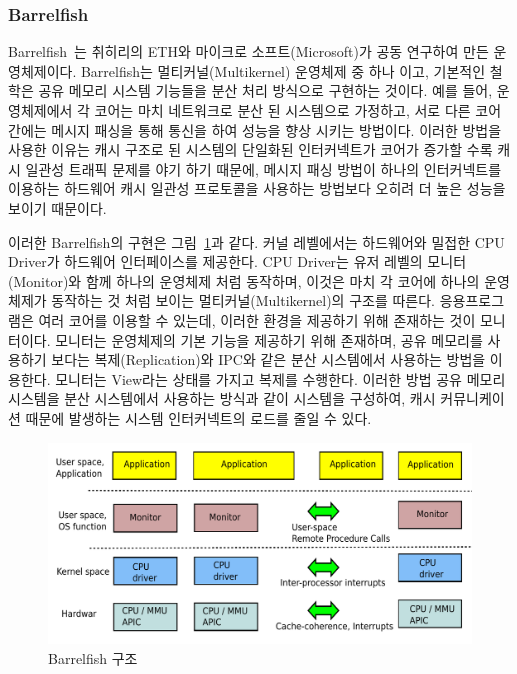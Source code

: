 \subsubsection{Barrelfish}

Barrelfish~\cite{Baumann2009Barrelfish}는 취히리의 ETH와 마이크로 소프트(Microsoft)가
공동 연구하여 만든 운영체제이다.
Barrelfish는 멀티커널(Multikernel) 운영체제 중 하나 이고, 기본적인 철학은 공유 메모리 시스템 
기능들을 분산 처리 방식으로 구현하는 것이다.
예를 들어, 운영체제에서 각 코어는 마치 네트워크로 분산 된 시스템으로 가정하고, 서로 다른 코어 간에는 메시지 
패싱을 통해 통신을 하여 성능을 향상 시키는 방법이다. 
이러한 방법을 사용한 이유는 캐시 구조로 된 시스템의 단일화된 인터커넥트가 코어가 증가할 수록 캐시 
일관성 트래픽 문제를 야기 하기 때문에, 메시지 패싱 방법이 하나의 인터커넥트를 이용하는 하드웨어 캐시 일관성 
프로토콜을 사용하는 방법보다 오히려 더 높은 성능을 보이기 때문이다. 

이러한 Barrelfish의 구현은 그림~\ref{fig:Barrelfish}과 같다.
커널 레벨에서는 하드웨어와 밀접한 CPU Driver가 하드웨어 인터페이스를 제공한다.
CPU Driver는 유저 레벨의 모니터(Monitor)와 함께 하나의 운영체제 처럼 동작하며, 
이것은 마치 각 코어에 하나의 운영체제가 동작하는 것 처럼 보이는 멀티커널(Multikernel)의 구조를 따른다.
응용프로그램은 여러 코어를 이용할 수 있는데, 이러한 환경을 제공하기 위해 존재하는 것이 모니터이다. 
모니터는 운영체제의 기본 기능을 제공하기 위해 존재하며, 공유 메모리를 사용하기 
보다는 복제(Replication)와 IPC와 같은 분산 시스템에서 사용하는 방법을 이용한다. 
모니터는 View라는 상태를 가지고 복제를 수행한다. 
이러한 방법 공유 메모리 시스템을 분산 시스템에서 사용하는 방식과 같이 시스템을 구성하여, 
캐시 커뮤니케이션 때문에 발생하는 시스템 인터커넥트의 로드를 줄일 수 있다.

\begin{figure}[h!]
    \centering
    \includegraphics[width=1\textwidth]{fig/multikernel/multikernel}
    \caption{Barrelfish 구조}
  \label{fig:Barrelfish}
\end{figure}

